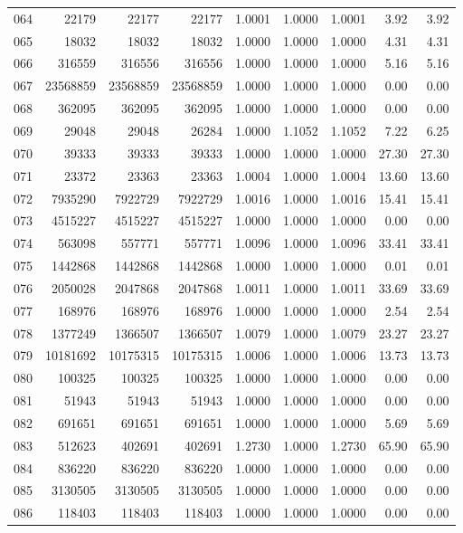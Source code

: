 \begin{longtable}{crrrrrrrr}
064 & 22179 & 22177 & 22177 & 1.0001 & 1.0000 & 1.0001 & 3.92 & 3.92 \\
065 & 18032 & 18032 & 18032 & 1.0000 & 1.0000 & 1.0000 & 4.31 & 4.31 \\
066 & 316559 & 316556 & 316556 & 1.0000 & 1.0000 & 1.0000 & 5.16 & 5.16 \\
067 & 23568859 & 23568859 & 23568859 & 1.0000 & 1.0000 & 1.0000 & 0.00 & 0.00 \\
068 & 362095 & 362095 & 362095 & 1.0000 & 1.0000 & 1.0000 & 0.00 & 0.00 \\
069 & 29048 & 29048 & 26284 & 1.0000 & 1.1052 & 1.1052 & 7.22 & 6.25 \\
070 & 39333 & 39333 & 39333 & 1.0000 & 1.0000 & 1.0000 & 27.30 & 27.30 \\
071 & 23372 & 23363 & 23363 & 1.0004 & 1.0000 & 1.0004 & 13.60 & 13.60 \\
072 & 7935290 & 7922729 & 7922729 & 1.0016 & 1.0000 & 1.0016 & 15.41 & 15.41 \\
073 & 4515227 & 4515227 & 4515227 & 1.0000 & 1.0000 & 1.0000 & 0.00 & 0.00 \\
074 & 563098 & 557771 & 557771 & 1.0096 & 1.0000 & 1.0096 & 33.41 & 33.41 \\
075 & 1442868 & 1442868 & 1442868 & 1.0000 & 1.0000 & 1.0000 & 0.01 & 0.01 \\
076 & 2050028 & 2047868 & 2047868 & 1.0011 & 1.0000 & 1.0011 & 33.69 & 33.69 \\
077 & 168976 & 168976 & 168976 & 1.0000 & 1.0000 & 1.0000 & 2.54 & 2.54 \\
078 & 1377249 & 1366507 & 1366507 & 1.0079 & 1.0000 & 1.0079 & 23.27 & 23.27 \\
079 & 10181692 & 10175315 & 10175315 & 1.0006 & 1.0000 & 1.0006 & 13.73 & 13.73 \\
080 & 100325 & 100325 & 100325 & 1.0000 & 1.0000 & 1.0000 & 0.00 & 0.00 \\
081 & 51943 & 51943 & 51943 & 1.0000 & 1.0000 & 1.0000 & 0.00 & 0.00 \\
082 & 691651 & 691651 & 691651 & 1.0000 & 1.0000 & 1.0000 & 5.69 & 5.69 \\
083 & 512623 & 402691 & 402691 & 1.2730 & 1.0000 & 1.2730 & 65.90 & 65.90 \\
084 & 836220 & 836220 & 836220 & 1.0000 & 1.0000 & 1.0000 & 0.00 & 0.00 \\
085 & 3130505 & 3130505 & 3130505 & 1.0000 & 1.0000 & 1.0000 & 0.00 & 0.00 \\
086 & 118403 & 118403 & 118403 & 1.0000 & 1.0000 & 1.0000 & 0.00 & 0.00 \\

\end{longtable}
